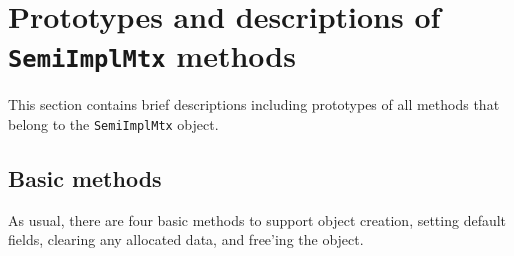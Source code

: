 \par
\section{Prototypes and descriptions of {\tt SemiImplMtx} methods}
\label{section:SemiImplMtx:proto}
\par
This section contains brief descriptions including prototypes
of all methods that belong to the {\tt SemiImplMtx} object.
\par
\subsection{Basic methods}
\label{subsection:SemiImplMtx:proto:basics}
\par
As usual, there are four basic methods to support object creation,
setting default fields, clearing any allocated data, and free'ing
the object.
\par
